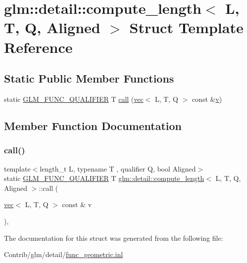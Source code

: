\hypertarget{structglm_1_1detail_1_1compute__length}{}\section{glm\+:\+:detail\+:\+:compute\+\_\+length$<$ L, T, Q, Aligned $>$ Struct Template Reference}
\label{structglm_1_1detail_1_1compute__length}
\subsection*{Static Public Member Functions}
\begin{DoxyCompactItemize}
\item 
static \mbox{\hyperlink{setup_8hpp_a33fdea6f91c5f834105f7415e2a64407}{G\+L\+M\+\_\+\+F\+U\+N\+C\+\_\+\+Q\+U\+A\+L\+I\+F\+I\+ER}} T \mbox{\hyperlink{structglm_1_1detail_1_1compute__length_a91fe692eca594f06b642810fd4fc1a6e}{call}} (\mbox{\hyperlink{structglm_1_1vec}{vec}}$<$ L, T, Q $>$ const \&\mbox{\hyperlink{_s_d_l__opengl_8h_a10a82eabcb59d2fcd74acee063775f90}{v}})
\end{DoxyCompactItemize}


\subsection{Member Function Documentation}
\mbox{\label{structglm_1_1detail_1_1compute__length_a91fe692eca594f06b642810fd4fc1a6e}} 
\subsubsection{\texorpdfstring{call()}{call()}}
{\footnotesize\ttfamily template$<$length\+\_\+t L, typename T , qualifier Q, bool Aligned$>$ \\
static \mbox{\hyperlink{setup_8hpp_a33fdea6f91c5f834105f7415e2a64407}{G\+L\+M\+\_\+\+F\+U\+N\+C\+\_\+\+Q\+U\+A\+L\+I\+F\+I\+ER}} T \mbox{\hyperlink{structglm_1_1detail_1_1compute__length}{glm\+::detail\+::compute\+\_\+length}}$<$ L, T, Q, Aligned $>$\+::call (\begin{DoxyParamCaption}\item[{\mbox{\hyperlink{structglm_1_1vec}{vec}}$<$ L, T, Q $>$ const \&}]{v }\end{DoxyParamCaption})\hspace{0.3cm}{\ttfamily [inline]}, {\ttfamily [static]}}



The documentation for this struct was generated from the following file\+:\begin{DoxyCompactItemize}
\item 
Contrib/glm/detail/\mbox{\hyperlink{func__geometric_8inl}{func\+\_\+geometric.\+inl}}\end{DoxyCompactItemize}
